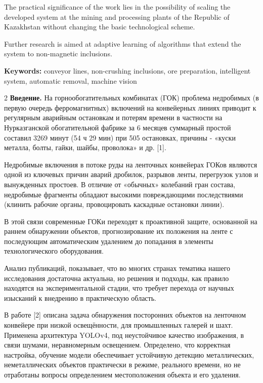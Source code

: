 The practical significance of the work lies in the possibility of
scaling the developed system at the mining and processing plants of the
Republic of Kazakhstan without changing the basic technological scheme.

Further research is aimed at adaptive learning of algorithms that extend
the system to non-magnetic inclusions.

{\bfseries Keywords:} conveyor lines, non-crushing inclusions, ore
preparation, intelligent system, automatic removal, machine vision

\begin{multicols}{2}
{\bfseries Введение.} На горнообогатительных комбинатах (ГОК) проблема
недробимых (в первую очередь ферромагнитных) включений на конвейерных
линиях приводит к регулярным аварийным остановкам и потерям времени в
частности на Нурказганской обогатительной фабрике за 6 месяцев суммарный
простой составил 3269 минут (54 ч 29 мин) при 505 остановках, причины -
«куски металла, болты, гайки, шайбы, проволока» и др. {[}1{]}.

Недробимые включения в потоке руды на ленточных конвейерах ГОКов
являются одной из ключевых причин аварий дробилок, разрывов ленты,
перегрузок узлов и вынужденных простоев. В отличие от «обычных»
колебаний гран состава, недробимые фрагменты обладают высокими
повреждающими последствиями (клинить рабочие органы, провоцировать
каскадные остановки линии).

В этой связи современные ГОКи переходят к проактивной защите, основанной
на раннем обнаружении объектов, прогнозирование их положения на ленте с
последующим автоматическим удалением до попадания в элементы
технологического оборудования.

Анализ публикаций, показывает, что во многих странах тематика нашего
исследования достаточна актуальна, но решения и подходы, как правило
находятся на экспериментальной стадии, что требует перехода от научных
изысканий к внедрению в практическую область.

В работе {[}2{]} описана задача обнаружения посторонних объектов на
ленточном конвейере при низкой освещённости, для промышленных галерей и
шахт. Применена архитектура YOLOv4, под неустойчивое качество
изображения, в связи шумами, неравномерным освещением. Определено, что
корректная настройка, обучение модели обеспечивает устойчивую детекцию
металлических, неметаллических объектов практически в режиме, реального
времени, но не отработаны вопросы определением местоположения объекта и
его удаления.


\end{multicols}
